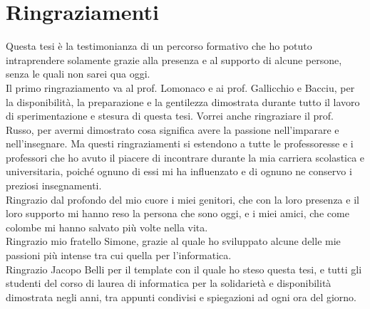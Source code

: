 \chapter*{Ringraziamenti}
Questa tesi è la testimonianza di un percorso formativo che ho potuto intraprendere solamente grazie alla presenza e al supporto di alcune persone, senza le quali non sarei qua oggi.\\
Il primo ringraziamento va al prof. Lomonaco e ai prof. Gallicchio e Bacciu, per la disponibilità, la preparazione e la gentilezza dimostrata durante tutto il lavoro di sperimentazione e stesura di questa tesi. Vorrei anche ringraziare il prof. Russo, per avermi dimostrato cosa significa avere la passione nell'imparare e nell'insegnare. Ma questi ringraziamenti si estendono a tutte le professoresse e i professori che ho avuto il piacere di incontrare durante la mia carriera scolastica e universitaria, poiché ognuno di essi mi ha influenzato e di ognuno ne conservo i preziosi insegnamenti.\\
Ringrazio dal profondo del mio cuore i miei genitori, che con la loro presenza e il loro supporto mi hanno reso la persona che sono oggi, e i miei amici, che come colombe mi hanno salvato più volte nella vita.\\
Ringrazio mio fratello Simone, grazie al quale ho sviluppato alcune delle mie passioni più intense tra cui quella per l'informatica.\\
Ringrazio Jacopo Belli per il template con il quale ho steso questa tesi, e tutti gli studenti del corso di laurea di informatica per la solidarietà e disponibilità dimostrata negli anni, tra appunti condivisi e spiegazioni ad ogni ora del giorno.
\cleardoublepage